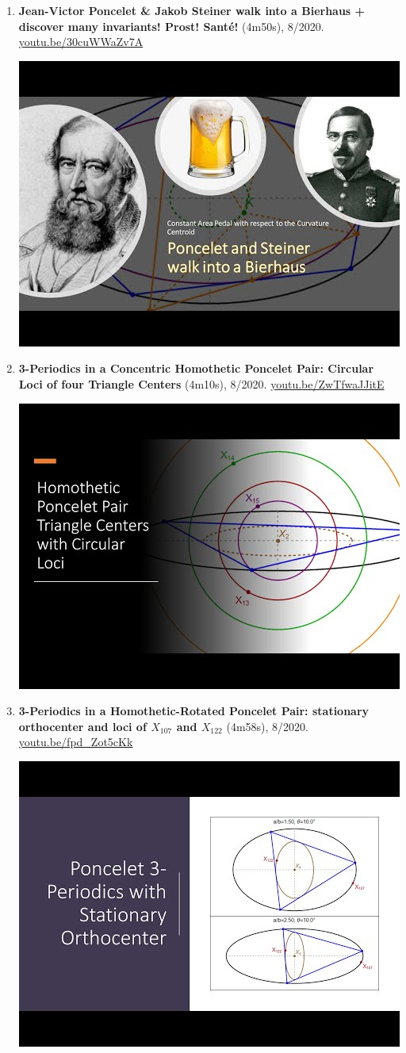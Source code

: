 \documentclass[12pt]{article}
\begin{document}
\begin{enumerate}[resume]
% 
\item \textbf{Jean-Victor Poncelet \& Jakob Steiner walk into a Bierhaus + discover many invariants! Prost! Santé!} (4m50s), 8/2020. \href{https://youtu.be/30cuWWaZv7A}{\url{youtu.be/30cuWWaZv7A}}
\begin{center}\includegraphics[width=.5\textwidth]{pics/30cuWWaZv7A.jpg}\end{center}
% 
\item \textbf{3-Periodics in a Concentric Homothetic Poncelet Pair: Circular Loci of four Triangle Centers} (4m10s), 8/2020. \href{https://youtu.be/ZwTfwaJJitE}{\url{youtu.be/ZwTfwaJJitE}}
\begin{center}\includegraphics[width=.5\textwidth]{pics/ZwTfwaJJitE.jpg}\end{center}
% 
\item \textbf{3-Periodics in a Homothetic-Rotated Poncelet Pair: stationary orthocenter and loci of $X_{107}$ and $X_{122}$} (4m58s), 8/2020. \href{https://youtu.be/fpd_Zot5cKk}{\url{youtu.be/fpd\_Zot5cKk}}
\begin{center}\includegraphics[width=.5\textwidth]{pics/fpd_Zot5cKk.jpg}\end{center}

\end{enumerate}
\end{document}
